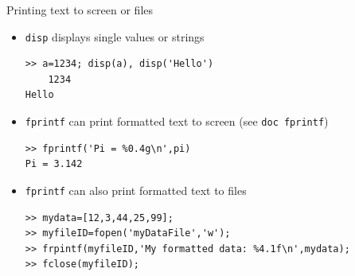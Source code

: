 \documentclass{beamer}
\begin{document}
\begin{frame}[fragile]{Printing text to screen or files}
	\begin{itemize}
		\item \texttt{disp} displays single values or strings
		
		\begin{lstlisting}[style=Matlab-editor]
>> a=1234; disp(a), disp('Hello')
    1234
Hello
		\end{lstlisting}
		\item \texttt{fprintf} can print formatted text to screen (see \texttt{doc fprintf})
		
		\begin{lstlisting}[style=Matlab-editor]
>> fprintf('Pi = %0.4g\n',pi)
Pi = 3.142
		\end{lstlisting}
			
		\item \texttt{fprintf} can also print formatted text to files
		\begin{lstlisting}[style=Matlab-editor]
>> mydata=[12,3,44,25,99];
>> myfileID=fopen('myDataFile','w');
>> frpintf(myfileID,'My formatted data: %4.1f\n',mydata);
>> fclose(myfileID);
		\end{lstlisting}
		
	\end{itemize}
\end{frame}


\end{document}
